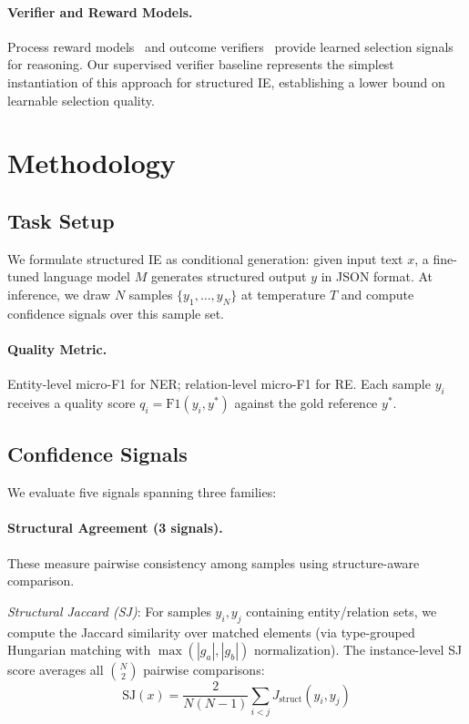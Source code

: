 \documentclass[11pt,a4paper]{article}
\begin{document}
\paragraph{Verifier and Reward Models.}
Process reward models~\citep{lightman2023verify} and outcome verifiers~\citep{cobbe2021gsm8k} provide learned selection signals for reasoning.
Our supervised verifier baseline represents the simplest instantiation of this approach for structured IE, establishing a lower bound on learnable selection quality.

\section{Methodology}

\subsection{Task Setup}

We formulate structured IE as conditional generation: given input text $x$, a fine-tuned language model $M$ generates structured output $y$ in JSON format.
At inference, we draw $N$ samples $\{y_1, \ldots, y_N\}$ at temperature $T$ and compute confidence signals over this sample set.

\paragraph{Quality Metric.}
Entity-level micro-F1 for NER; relation-level micro-F1 for RE.
Each sample $y_i$ receives a quality score $q_i = \text{F1}(y_i, y^*)$ against the gold reference $y^*$.

\subsection{Confidence Signals}

We evaluate five signals spanning three families:

\paragraph{Structural Agreement (3 signals).}
These measure pairwise consistency among samples using structure-aware comparison.

\emph{Structural Jaccard (SJ)}: For samples $y_i, y_j$ containing entity/relation sets, we compute the Jaccard similarity over matched elements (via type-grouped Hungarian matching with $\max(|g_a|,|g_b|)$ normalization).
The instance-level SJ score averages all $\binom{N}{2}$ pairwise comparisons:
\begin{equation}
    \text{SJ}(x) = \frac{2}{N(N-1)} \sum_{i<j} J_{\text{struct}}(y_i, y_j)
\end{equation}
\end{document}
